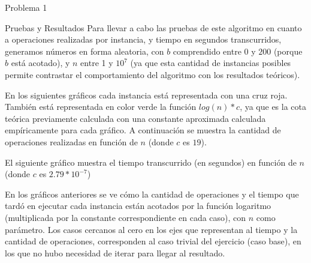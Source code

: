 \begin{section}{Problema 1}
\begin{subsection}{Pruebas y Resultados}
		Para llevar a cabo las pruebas de este algoritmo en cuanto a operaciones realizadas por instancia, y tiempo en segundos transcurridos, generamos números en forma aleatoria, con $b$ comprendido entre $0$ y $200$ (porque $b$ está acotado), y $n$ entre 1 y $10^7$ (ya que esta cantidad de instancias posibles permite contrastar el comportamiento del algoritmo con los resultados teóricos).

En los siguientes gráficos cada instancia está representada con una cruz roja. También está representada en color verde la función $log(n)*c$, ya que es la cota teórica previamente calculada con una constante aproximada calculada empíricamente para cada gráfico.
A continuación se muestra la cantidad de operaciones realizadas en función de $n$ (donde $c$ es $19$). \\
		\VSP

El siguiente gráfico muestra el tiempo transcurrido (en segundos) en función de $n$ (donde $c$ es $2.79*10^{-7}$)\\

En los gráficos anteriores se ve cómo la cantidad de operaciones y el tiempo que tardó en ejecutar cada instancia están acotados por la función logaritmo (multiplicada por la constante correspondiente en cada caso), con $n$ como parámetro. Los casos cercanos al cero en los ejes que representan al tiempo y la cantidad de operaciones, co\-rres\-pon\-den al caso trivial del ejercicio (caso base), en los que no hubo necesidad de iterar para llegar al resultado.\Pa


\end{subsection}
\end{section}
